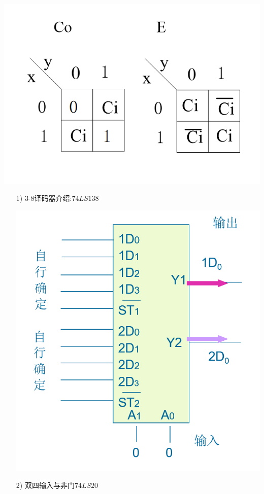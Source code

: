 \documentclass[UTF8]{ctexart}
\begin{document}
\begin{enumerate}
\begin{itemize}
\begin{itemize}
\begin{center}
                            \label{fig:label}
                            \includegraphics[scale=0.4]{12.png}
                            \label{fig:label}
                        \end{center}
                              \begin{itemize}
                                  \item [1)]  3-8译码器介绍:$74LS138$
                                  \begin{center}
                                      \includegraphics[scale=0.4]{10.png}
                                  \end{center}
                                  \item [2)]  双四输入与非门$74LS20$


\end{itemize}
\end{itemize}
\end{itemize}
\end{enumerate}
\end{document}
